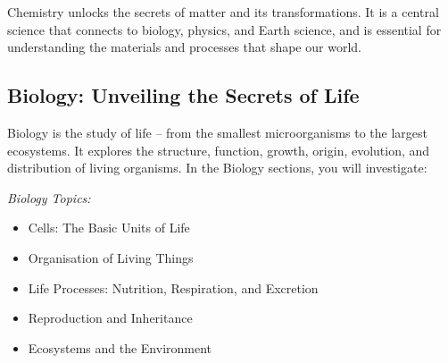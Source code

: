 Chemistry unlocks the secrets of matter and its transformations.  It is a central science that connects to biology, physics, and Earth science, and is essential for understanding the materials and processes that shape our world.

\FloatBarrier

\subsection{Biology: Unveiling the Secrets of Life}

Biology is the study of life – from the smallest microorganisms to the largest ecosystems.  It explores the structure, function, growth, origin, evolution, and distribution of living organisms.  In the Biology sections, you will investigate:

\begin{marginnote}
\textit{Biology Topics:}
\begin{itemize}
    \item Cells: The Basic Units of Life
    \item Organisation of Living Things
    \item Life Processes: Nutrition, Respiration, and Excretion
    \item Reproduction and Inheritance
    \item Ecosystems and the Environment
\end{itemize}
\end{marginnote}

